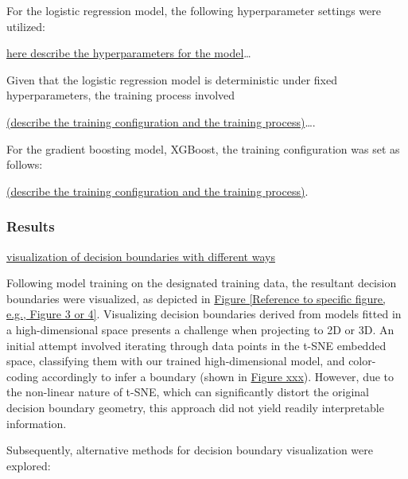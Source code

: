 \documentclass{article}
\begin{document}
For the logistic regression model, the following hyperparameter settings were utilized: 

\underline{here describe the hyperparameters for the model}\ldots

Given that the logistic regression model is deterministic under fixed hyperparameters, the training process involved 

\underline{(describe the training configuration and the training process)}\ldots.

For the gradient boosting model, XGBoost, the training configuration was set as follows: 

\underline{(describe the training configuration and the training process)}.

\subsubsection*{Results}



\underline{visualization of decision boundaries with different ways} %

Following model training on the designated training data, the resultant decision boundaries were visualized, as depicted in \underline{Figure [Reference to specific figure, e.g., Figure 3 or 4]}. Visualizing decision boundaries derived from models fitted in a high-dimensional space presents a challenge when projecting to 2D or 3D. An initial attempt involved iterating through data points in the t-SNE embedded space, classifying them with our trained high-dimensional model, and color-coding accordingly to infer a boundary (shown in \underline{Figure xxx}). However, due to the non-linear nature of t-SNE, which can significantly distort the original decision boundary geometry, this approach did not yield readily interpretable information.

Subsequently, alternative methods for decision boundary visualization were explored:
\end{document}

